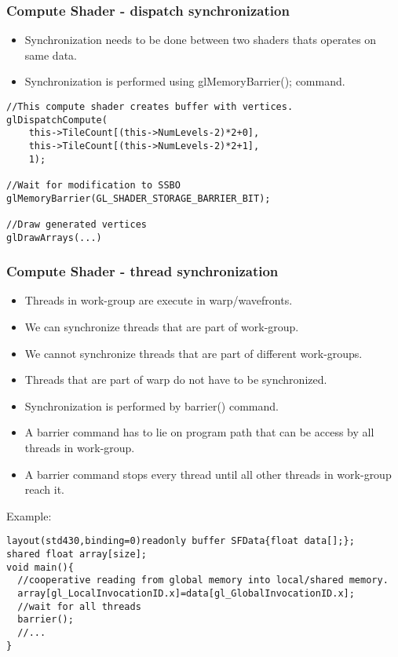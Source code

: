 \begin{frame}[fragile]
\frametitle{Compute Shader - dispatch synchronization}
  \begin{itemize}
    \item Synchronization needs to be done between two shaders thats operates on same data.
    \item Synchronization is performed using glMemoryBarrier(); command.
  \end{itemize}

	{\scriptsize
	\begin{verbatim}
//This compute shader creates buffer with vertices.
glDispatchCompute(
    this->TileCount[(this->NumLevels-2)*2+0],
    this->TileCount[(this->NumLevels-2)*2+1],
    1);

//Wait for modification to SSBO
glMemoryBarrier(GL_SHADER_STORAGE_BARRIER_BIT);

//Draw generated vertices
glDrawArrays(...)
	\end{verbatim}
	}
\end{frame}

\begin{frame}[fragile]
\frametitle{Compute Shader - thread synchronization}
  \begin{itemize}
    \item Threads in work-group are execute in warp/wavefronts.
    \item We can synchronize threads that are part of work-group.
    \item We cannot synchronize threads that are part of different work-groups.
    \item Threads that are part of warp do not have to be synchronized.
    \item Synchronization is performed by barrier() command.
    \item A barrier command has to lie on program path that can be access by all threads in work-group.
    \item A barrier command stops every thread until all other threads in work-group reach it.
  \end{itemize}
  Example:
	{\scriptsize
	\begin{verbatim}
layout(std430,binding=0)readonly buffer SFData{float data[];};
shared float array[size];
void main(){
  //cooperative reading from global memory into local/shared memory.
  array[gl_LocalInvocationID.x]=data[gl_GlobalInvocationID.x];
  //wait for all threads
  barrier();
  //...
}
	\end{verbatim}
	}
\end{frame}

